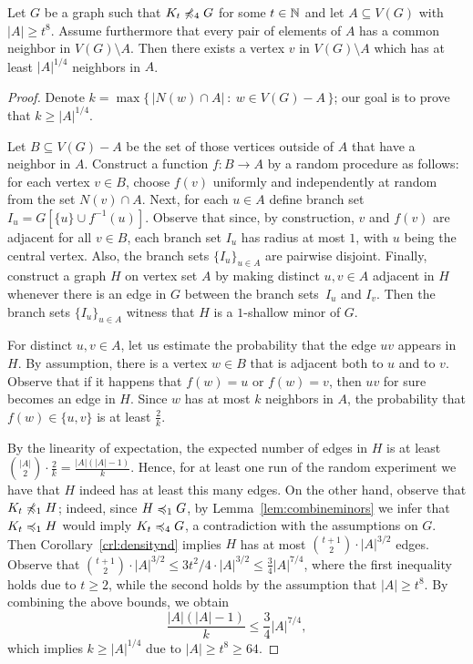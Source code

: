 \begin{lemma}\label{lem:diversity}
  Let $G$ be a graph such that $K_t\not\preccurlyeq_4G$ for some
  $t\in\mathbb{N}$ and let $A\subseteq V(G)$ with $|A|\geq t^{8}$. 
  Assume furthermore that every pair of elements of $A$ has a common neighbor in $V(G)\setminus A$.
  Then there exists a vertex $v$ in $V(G)\setminus A$ which has at least $|A|^{1/4}$ neighbors in $A$.
\end{lemma}
\begin{proof}
Denote $k=\max\{\,|N(w)\cap A|\ \colon\ w\in V(G)-A\,\}$; our goal is to prove that $k\geq |A|^{1/4}$.

Let $B\subseteq V(G)-A$ be the set of those vertices outside of $A$ that have a  neighbor in $A$. 
Construct a function $f\colon B\to A$ by a random procedure as follows:
for each vertex $v\in B$, choose $f(v)$ uniformly and independently at random from the set $N(v)\cap A$.
Next, for each $u\in A$ define branch set $I_u=G[\{u\}\cup f^{-1}(u)]$. Observe that since, by construction, $v$ and $f(v)$ are adjacent for all $v\in B$, each branch set $I_u$ has radius at most $1$,
with $u$ being the central vertex. Also, the branch sets $\{I_u\}_{u\in A}$ are pairwise disjoint.
Finally, construct a graph $H$ on vertex set $A$ by making distinct $u,v\in A$ adjacent in $H$ whenever there is an edge in $G$ between the branch sets~$I_u$ and $I_v$.
Then the branch sets $\{I_u\}_{u\in A}$ witness that $H$ is a $1$-shallow minor of $G$.

For distinct $u,v\in A$, let us estimate the probability that the edge $uv$ appears in $H$.
By assumption, there is a vertex $w\in B$ that is adjacent both to $u$ and to $v$. Observe that if it happens that $f(w)=u$ or $f(w)=v$, then $uv$ for sure becomes an edge in $H$. 
Since $w$ has at most $k$ neighbors in $A$, the probability that $f(w)\in \{u,v\}$ is at least $\frac{2}{k}$.

By the linearity of expectation, the expected number of edges in $H$ is at least $\binom{|A|}{2}\cdot \frac{2}{k}=\frac{|A|(|A|-1)}{k}$.
Hence, for at least one run of the random experiment we have that $H$ indeed has at least this many edges. 
On the other hand, observe that $K_t\not\preccurlyeq_1 H$; indeed, since $H\preccurlyeq_1 G$, by Lemma~\ref{lem:combineminors} we infer that $K_t\preccurlyeq_1 H$ would imply $K_t\preccurlyeq_4 G$, a contradiction with the assumptions on $G$.
Then Corollary~\ref{crl:densitynd} implies $H$ has at most $\binom{t+1}{2}\cdot |A|^{3/2}$ edges.
Observe that 
$\binom{t+1}{2}\cdot |A|^{3/2}\leq 3t^2/4\cdot |A|^{3/2}\leq \frac{3}{4}|A|^{7/4}$,
where the first inequality holds due to $t\geq 2$, while the second holds by the assumption that $|A|\geq t^8$.
By combining the above bounds, we obtain
$$\frac{|A|(|A|-1)}{k}\leq \frac{3}{4}|A|^{7/4},$$
which implies $k\geq |A|^{1/4}$ due to $|A|\geq t^8\geq 64$.
\end{proof}

